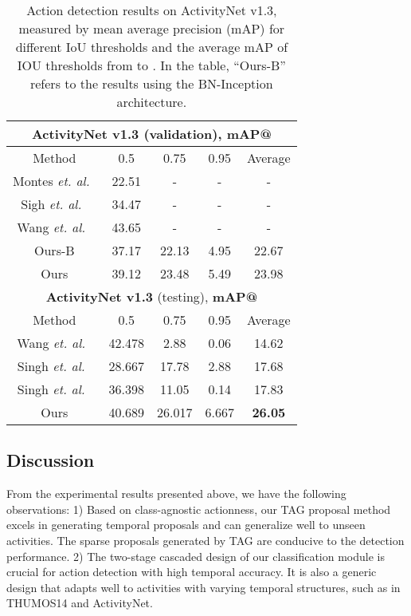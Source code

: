 \documentclass[10pt,twocolumn,letterpaper]{article}
\begin{document}
\begin{table}[t]
	\begin{center}
		\begin{tabular}{c|ccc|c}
			\hline
			\multicolumn{5}{c}{\textbf{ActivityNet v1.3} (validation), \textbf{mAP@}}   \\ \hline
			Method & 0.5 & 0.75 & 0.95 &Average\\ \hline
Montes \emph{et. al.}~\cite{Montes_2016_NIPSWS} & 22.51 & - & - &  -      \\ \hline
			Sigh \emph{et. al.}~\cite{DBLP:journals/corr/SinghC16} & 34.47 & - & - &    -         \\ \hline
			Wang \emph{et. al.}~\cite{UTS} & 43.65 &  -  & -  &  -      \\ \hline\hline
			Ours-B& 37.17 & 22.13 & 4.95 & 22.67       \\ \hline
			Ours & 39.12 & 23.48 & 5.49 & 23.98       \\ \hline\hline
			\multicolumn{5}{c}{\textbf{ActivityNet v1.3} (testing),  \textbf{mAP@}}   \\ \hline
			Method & 0.5 & 0.75 & 0.95 &Average\\ \hline
			Wang \emph{et. al.}~\cite{UTS}  & 42.478 & 2.88 & 0.06 & 14.62 \\ \hline
			Singh \emph{et. al.}~\cite{Singh_2016_CVPR} & 28.667 & 17.78 & 2.88 & 17.68 \\ \hline
			Singh \emph{et. al.}~\cite{DBLP:journals/corr/SinghC16}& 36.398 & 11.05 & 0.14 & 17.83 \\ \hline\hline
			Ours& 40.689 & 26.017 & 6.667 &   {\bf 26.05}     \\ \hline
		\end{tabular}
	\end{center}
	\caption{Action detection results on ActivityNet v1.3, measured by mean average precision (mAP) for different IoU thresholds  and the average mAP of IOU thresholds from  to . In the table, ``Ours-B'' refers to the results using the BN-Inception architecture.}
	\label{table:anet_v1.3}
\end{table}



\subsection{Discussion}
From the experimental results presented above,
we have the following observations:
1) Based on class-agnostic actionness, our TAG proposal method excels in generating temporal proposals and can generalize well to unseen activities.
The sparse proposals generated by TAG are conducive to the detection performance. 
2) The two-stage cascaded design of our classification module is crucial for action detection with high temporal accuracy. It is also a generic design that adapts well to activities with varying temporal structures, such as in THUMOS14 and ActivityNet.
\end{document}

